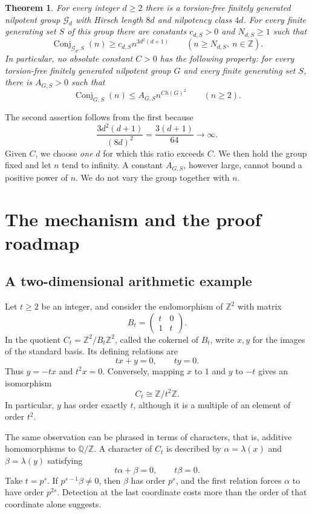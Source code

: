 \documentclass[11pt]{article}
\numberwithin{equation}{section}
\newtheorem{theorem}{Theorem}[section]
\theoremstyle{definition}
\theoremstyle{remark}
\newcommand{\Z}{\mathbb Z}
\newcommand{\Q}{\mathbb Q}
\newcommand{\Conj}{\operatorname{Conj}}
\begin{document}
\begin{theorem}\label{thm:main}
For every integer $d\ge2$ there is a torsion-free finitely generated nilpotent group $\mathcal G_d$ with Hirsch length $8d$ and nilpotency class $4d$. For every finite generating set $S$ of this group there are constants $c_{d,S}>0$ and $N_{d,S}\ge1$ such that
\[
\Conj_{\mathcal G_d,S}(n)\ge c_{d,S}n^{3d^2(d+1)}
\qquad(n\ge N_{d,S},\ n\in\Z).
\]
In particular, no absolute constant $C>0$ has the following property: for every torsion-free finitely generated nilpotent group $G$ and every finite generating set $S$, there is $A_{G,S}>0$ such that
\[
\Conj_{G,S}(n)\le A_{G,S}n^{C h(G)^2}\qquad(n\ge2).
\]
\end{theorem}

The second assertion follows from the first because
\begin{equation}\label{eq:ratioquadratic}
\frac{3d^2(d+1)}{(8d)^2}=\frac{3(d+1)}{64}\longrightarrow\infty.
\end{equation}
Given $C$, we choose \emph{one} $d$ for which this ratio exceeds $C$. We then hold the group fixed and let $n$ tend to infinity. A constant $A_{G,S}$, however large, cannot bound a positive power of $n$. We do not vary the group together with $n$.

\section{The mechanism and the proof roadmap}\label{sec:roadmap}
\subsection{A two-dimensional arithmetic example}
Let $t\ge2$ be an integer, and consider the endomorphism of $\Z^2$ with matrix
\[
B_t=\begin{pmatrix}t&0\\1&t\end{pmatrix}.
\]
In the quotient $C_t=\Z^2/B_t\Z^2$, called the cokernel of $B_t$, write $x,y$ for the images of the standard basis. Its defining relations are
\[
tx+y=0,\qquad ty=0.
\]
Thus $y=-tx$ and $t^2x=0$. Conversely, mapping $x$ to $1$ and $y$ to $-t$ gives an isomorphism
\[
C_t\cong\Z/t^2\Z.
\]
In particular, $y$ has order exactly $t$, although it is a multiple of an element of order $t^2$.

The same observation can be phrased in terms of characters, that is, additive homomorphisms to $\Q/\Z$. A character of $C_t$ is described by $\alpha=\lambda(x)$ and $\beta=\lambda(y)$ satisfying
\[
t\alpha+\beta=0,\qquad t\beta=0.
\]
Take $t=p^s$. If $p^{s-1}\beta\ne0$, then $\beta$ has order $p^s$, and the first relation forces $\alpha$ to have order $p^{2s}$. Detection at the last coordinate costs more than the order of that coordinate alone suggests.
\end{document}

